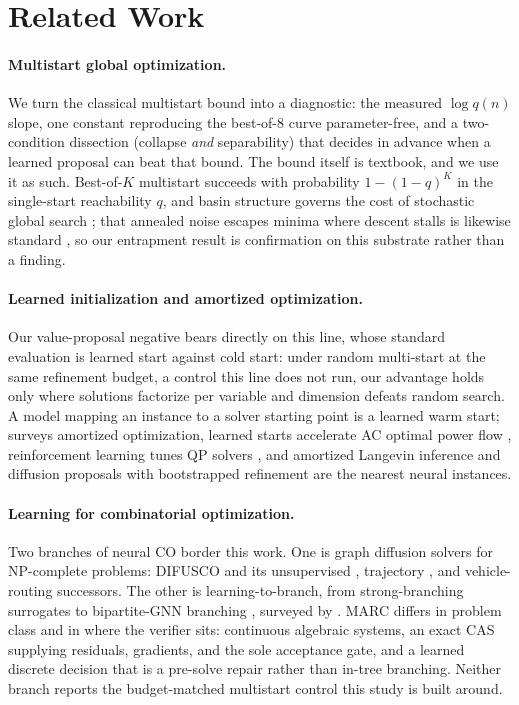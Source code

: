 \documentclass[letterpaper]{article} %
\begin{document}
\section{Related Work}
\label{sec:related}

\paragraph{Multistart global optimization.}
We turn the classical multistart bound into a diagnostic: the measured $\log q(n)$ slope, one
constant reproducing the best-of-8 curve parameter-free, and a two-condition dissection
(collapse \emph{and} separability) that decides in advance when a learned proposal can beat
that bound. The bound itself is textbook, and we use it as such. Best-of-$K$ multistart
succeeds with probability $1-(1-q)^K$ in the single-start reachability $q$, and basin
structure governs the cost of stochastic global search \citep{rinnooykan1987clustering,
rinnooykan1987multilevel}; that annealed noise escapes minima where descent stalls is likewise
standard \citep{welling2011sgld, bras2021langevin, regularized2025langevin}, so our
entrapment result is confirmation on this substrate rather than a finding.

\paragraph{Learned initialization and amortized optimization.}
Our value-proposal negative bears directly on this line, whose standard evaluation is learned
start against cold start: under random multi-start at the same refinement budget, a control this
line does not run, our advantage holds only where solutions factorize per variable and
dimension defeats random search. A model mapping an instance to a solver starting point is a
learned warm start; \citet{amos2023amortized} surveys amortized optimization, learned starts
accelerate AC optimal power flow \citep{baker2019warmstart}, reinforcement learning tunes QP
solvers \citep{ichnowski2021rlqp}, and amortized Langevin inference
\citep{taniguchi2022langevin} and diffusion proposals with bootstrapped refinement
\citep{bootstrapped2025refinement} are the nearest neural instances.

\paragraph{Learning for combinatorial optimization.}
Two branches of neural CO border this work. One is graph diffusion solvers for NP-complete
problems: DIFUSCO \citep{sun2023difusco} and its unsupervised \citep{sanokowski2024diffuco},
trajectory \citep{li2024constraintaware}, and vehicle-routing \citep{anon2026vrpdiffusion}
successors. The other is learning-to-branch, from strong-branching surrogates \citep{khalil2016branch}
to bipartite-GNN branching \citep{gasse2019exact}, surveyed by \citet{bengio2021mlco}. MARC
differs in problem class and in where the verifier sits: continuous algebraic systems, an
exact CAS supplying residuals, gradients, and the sole acceptance gate, and a learned discrete
decision that is a pre-solve repair rather than in-tree branching. Neither branch reports the
budget-matched multistart control this study is built around.
\end{document}
